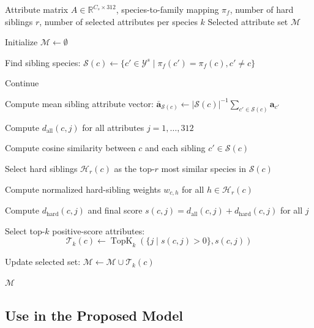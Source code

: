 \begin{algorithm}[t]
\footnotesize
\caption{Species-Level Hard-Sibling Discriminative Attribute Selection}
\label{alg:hsdas_species}
\begin{algorithmic}[1]
\REQUIRE Attribute matrix \(A \in \mathbb{R}^{C_s \times 312}\), species-to-family mapping \(\pi_f\), number of hard siblings \(r\), number of selected attributes per species \(k\)
\ENSURE Selected attribute set \(\mathcal{M}\)

\STATE Initialize \(\mathcal{M} \leftarrow \emptyset\)

    \STATE Find sibling species:
    \(\mathcal{S}(c) \leftarrow \{c' \in \mathcal{Y}^{s} \mid \pi_f(c')=\pi_f(c), c' \neq c\}\)

        \STATE Continue
    \ENDIF

    \STATE Compute mean sibling attribute vector:
    \(\bar{\mathbf{a}}_{\mathcal{S}(c)} \leftarrow
    |\mathcal{S}(c)|^{-1}\sum_{c' \in \mathcal{S}(c)} \mathbf{a}_{c'}\)

    \STATE Compute \(d_{\mathrm{all}}(c,j)\) for all attributes \(j=1,\ldots,312\)

    \STATE Compute cosine similarity between \(c\) and each sibling \(c' \in \mathcal{S}(c)\)

    \STATE Select hard siblings \(\mathcal{H}_r(c)\) as the top-\(r\) most similar species in \(\mathcal{S}(c)\)

    \STATE Compute normalized hard-sibling weights \(w_{c,h}\) for all \(h \in \mathcal{H}_r(c)\)

    \STATE Compute \(d_{\mathrm{hard}}(c,j)\) and final score
    \(s(c,j)=d_{\mathrm{all}}(c,j)+d_{\mathrm{hard}}(c,j)\) for all \(j\)

    \STATE Select top-\(k\) positive-score attributes:
    \[
        \mathcal{T}_k(c)
        \leftarrow
        \operatorname{TopK}_{k}
        \left(
            \{j \mid s(c,j)>0\},
            s(c,j)
        \right)
    \]

    \STATE Update selected set:
    \(\mathcal{M} \leftarrow \mathcal{M} \cup \mathcal{T}_k(c)\)
\ENDFOR

\RETURN \(\mathcal{M}\)
\end{algorithmic}
\end{algorithm}

\subsection{Use in the Proposed Model}

